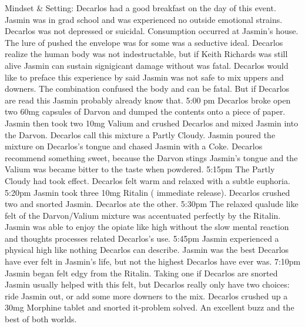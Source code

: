 \documentclass[12pt]{book}
\begin{document}
Mindset \& Setting: Decarlos had a good breakfast on the day of this event. Jasmin was in grad school and was experienced no outside emotional strains. Decarlos was not depressed or suicidal. Consumption occurred at Jasmin's house. The lure of pushed the envelope was for some was a seductive ideal. Decarlos realize the human body was not indestructable, but if Keith Richards was still alive Jasmin can sustain signigicant damage without was fatal. Decarlos would like to preface this experience by said Jasmin was not safe to mix uppers and downers. The combination confused the body and can be fatal. But if Decarlos are read this Jasmin probably already know that. 5:00 pm Decarlos broke open two 60mg capsules of Darvon and dumped the contents onto a piece of paper. Jasmin then took two 10mg Valium and crushed Decarlos and mixed Jasmin into the Darvon. Decarlos call this mixture a Partly Cloudy. Jasmin poured the mixture on Decarlos's tongue and chased Jasmin with a Coke. Decarlos recommend something sweet, because the Darvon stings Jasmin's tongue and the Valium was became bitter to the taste when powdered. 5:15pm The Partly Cloudy had took effect. Decarlos felt warm and relaxed with a subtle euphoria. 5:20pm Jasmin took three 10mg Ritalin ( immediate release). Decarlos crushed two and snorted Jasmin. Decarlos ate the other. 5:30pm The relaxed qualude like felt of the Darvon/Valium mixture was accentuated perfectly by the Ritalin. Jasmin was able to enjoy the opiate like high without the slow mental reaction and thoughts processes related Decarlos's use. 5:45pm Jasmin experienced a physical high like nothing Decarlos can describe. Jasmin was the best Decarlos have ever felt in Jasmin's life, but not the highest Decarlos have ever was. 7:10pm Jasmin began felt edgy from the Ritalin. Taking one if Decarlos are snorted Jasmin usually helped with this felt, but Decarlos really only have two choices: ride Jasmin out, or add some more downers to the mix. Decarlos crushed up a 30mg Morphine tablet and snorted it-problem solved. An excellent buzz and the best of both worlds.
\end{document}
